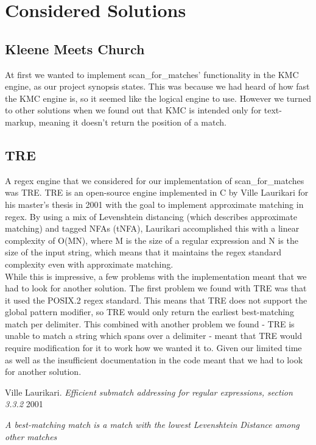 \documentclass[11pt,twoside,a4paper]{article}
\begin{document}
\section{Considered Solutions}
\subsection{Kleene Meets Church}
At first we wanted to implement scan\_for\_matches' functionality in the 
KMC engine, as our project synopsis states. This was because we had heard of 
how fast the KMC engine is, so it seemed like the logical engine to use. 
However we turned to other solutions when we found out that 
KMC is intended only for text-markup, meaning it doesn't return the position 
of a match. 

\subsection{TRE}
A regex engine that we considered for our implementation of scan\_for\_matches 
was TRE. TRE is an open-source engine implemented in C by Ville Laurikari for 
his master's thesis in 2001 with the goal to implement approximate matching in 
regex. By using a mix of Levenshtein distancing (which describes 
approximate matching) and tagged NFAs (tNFA), Laurikari accomplished this with a 
linear complexity of O(MN), where M is the size of a regular expression and N is the 
size of the input string\cite{LaurikariComplex}, which means that it maintains the 
regex standard complexity even with approximate matching. \\
While this is impressive, a few problems with the implementation meant that we 
had to look for another solution. The first problem we found with TRE was that 
it used the POSIX.2 regex standard. This means that TRE does not support the 
global pattern modifier, so TRE would only return the earliest best-matching 
match per delimiter\cite{Best-Match}. This combined with another problem we found 
- TRE is unable to match a string which spans over a delimiter - meant that 
TRE would require modification for it to work how we wanted it to. Given our 
limited time as well as the insufficient documentation in the code meant that 
we had to look for another solution.

\begin{thebibliography}{9}
Ville Laurikari.
\textit{Efficient submatch addressing for regular expressions, section 3.3.2}
2001

\textit{A best-matching match is a match with the lowest Levenshtein Distance among other matches}

\end{thebibliography}
\end{document}
